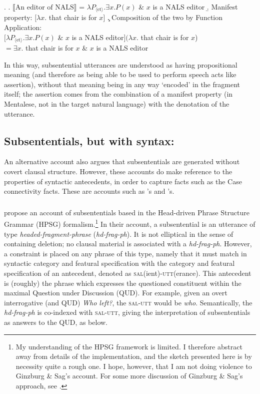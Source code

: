 \documentclass[doublespace]{umthesis}
\newcommand{\ext}[1]{\ensuremath{\llbracket \textrm{{#1}} \rrbracket}}
\newcommand{\ty}[1]{\ensuremath{\mathrm{\langle #1 \rangle}}}
\begin{document}
\ex. 		\a. \ext{An editor of NALS} = $\lambda P_{\ty{et}}. \exists x. P(x) $ \& $ x$ is a NALS editor
		\b. Manifest property: $[\lambda x. $ that chair is for $x]$
		\c. Composition of the two by Function Application:\\
		  	$[\lambda P_{\ty{et}}. \exists x. P(x) $ \& $x$ is a NALS editor$](\lambda x. $ that chair is for $x$) \\
		  	$= \exists x. $ that chair is for $x$ \& $x$ is a NALS editor

In this way, subsentential utterances are understood as having propositional meaning (and therefore as being able to be used to perform speech acts like assertion), without that meaning being in any way `encoded' in the fragment itself; the assertion comes from the combination of a manifest property (in Mentalese, not in the target natural language) with the denotation of the utterance.

\subsection{Subsententials, but with syntax: \cite{GS00, Ja13}}

An alternative account also argues that subsententials are generated without covert clausal structure. However, these accounts do make reference to the properties of syntactic antecedents, in order to capture facts such as the Case connectivity facts. These are accounts such as \cite{GS00}'s and \cite{Ja13}'s.

\subsubsection{\cite{GS00}}

\cite{GS00} propose an account of subsententials based in the Head-driven Phrase Structure Grammar (HPSG) formalism.\footnote{My understanding of the HPSG framework is limited. I therefore abstract away from details of the implementation, and the sketch presented here is by necessity quite a rough one. I hope, however, that I am not doing violence to Ginzburg \& Sag's account. For some more discussion of Ginzburg \& Sag's approach, see \cite{Me04}.} In their account, a subsentential is an utterance of type {\it headed-fragment-phrase} ({\it hd-frag-ph}). It is not elliptical in the sense of containing  deletion; no clausal material is associated with a {\it hd-frag-ph}. However, a constraint is placed on any phrase of this type, namely that it must match in syntactic category and featural specification with the category and featural specification of an antecedent, denoted as \textsc{sal}(ient)-\textsc{utt}(erance). This antecedent is (roughly) the phrase which expresses the questioned constituent within the maximal Question under Discussion (QUD). For example, given an overt interrogative (and QUD) {\it Who left?}, the \textsc{sal-utt} would be {\it who}. Semantically, the {\it hd-frag-ph} is co-indexed with \textsc{sal-utt}, giving the interpretation of subsententials as answers to the QUD, as below.
\end{document}
